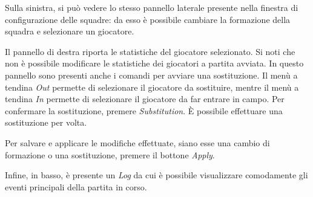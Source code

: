 Sulla sinistra, si può vedere lo stesso pannello laterale presente nella finestra di configurazione delle squadre: da esso è possibile cambiare la formazione della squadra e selezionare un giocatore. 

Il pannello di destra riporta le statistiche del giocatore selezionato. Si noti che non è possibile modificare le statistiche dei giocatori a partita avviata. In questo pannello sono presenti anche i comandi per avviare una sostituzione. Il menù a tendina \emph{Out} permette di selezionare il giocatore da sostituire, mentre il menù a tendina \emph{In} permette di selezionare il giocatore da far entrare in campo. Per confermare la sostituzione, premere \emph{Substitution}. \`{E} possibile effettuare una sostituzione per volta.

Per salvare e applicare le modifiche effettuate, siano esse una cambio di formazione o una sostituzione, premere il bottone \emph{Apply}. 

Infine, in basso, è presente un \emph{Log} da cui è possibile visualizzare comodamente gli eventi principali della partita in corso.